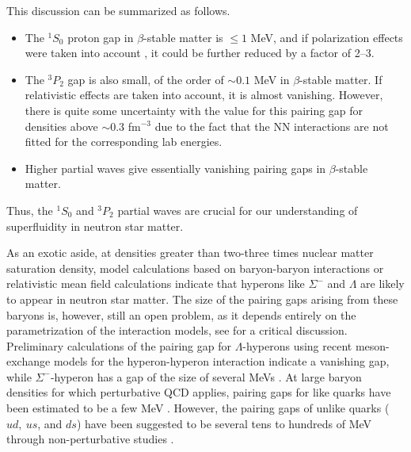 \documentclass[preprint,rmp,aps,floatfix]{revtex4}
\begin{document}
This discussion  can be summarized as follows.
\begin{itemize}
      \item The $^1S_0$ proton gap in $\beta$-stable matter
            is $ \le 1$ MeV, and if polarization
            effects were taken into account \cite{sclbl96},
            it could be further reduced by a factor of 2--3.
      \item The $^3P_2$ gap is also small, of the order
            of $\sim 0.1$ MeV in $\beta$-stable matter.
            If relativistic effects are taken into account,
            it is almost vanishing. However, there is
            quite some uncertainty with the value for this
            pairing gap for densities above $\sim 0.3$
            fm$^{-3}$ due to the fact that the NN interactions
            are not fitted for the corresponding lab energies. 
      \item Higher partial waves give essentially vanishing
            pairing gaps in $\beta$-stable matter.
\end{itemize}
Thus, the $^1S_0$ and $^3P_2$ partial waves are crucial for our
understanding of superfluidity in neutron star matter. 

As an exotic aside, at densities greater than two-three times nuclear
matter saturation density, model calculations based on baryon-baryon
interactions \cite{stoks99,stoks2000,isaac2000,schulze1998,schulze2000b} or relativistic mean field calculations \cite{glendenning2000} indicate that hyperons like $\Sigma^-$ 
and $\Lambda$ are likely to appear in neutron star matter.
The size of the pairing gaps arising from these baryons is, however,
still an open problem, as it  depends entirely on the parametrization 
of the interaction models, see \cite{barnea1996,balberg1999,taka2002} 
for a critical 
discussion. 
Preliminary calculations of the pairing gap for $\Lambda$-hyperons
using recent  meson-exchange models for the hyperon-hyperon interaction  
\cite{stoks99} indicate a vanishing gap, while $\Sigma^-$-hyperon
has a gap of the size of several MeVs \cite{shulzeelgaroy_priv}.
 At large baryon densities for which perturbative QCD
applies, pairing gaps for like quarks have been estimated to be a few
MeV \cite{bailin84}.  However, the pairing gaps of unlike quarks ($ud,~
us$, and $ds$) have been suggested to be several tens to
hundreds of MeV through non-perturbative studies \cite{qsf0}.
\end{document}
